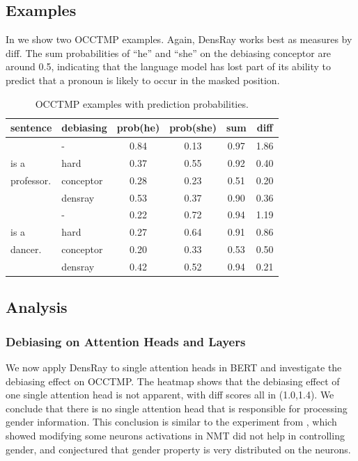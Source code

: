 \subsection{Examples}
In  we show two OCCTMP examples.
Again, DensRay works best as measures by diff.
The sum probabilities of ``he'' and ``she''
on the debiasing conceptor are around 0.5, indicating that
the language model has lost part of its ability to predict that 
a pronoun is  likely to occur in the masked position.
\begin{table}[h]
	\centering
	\footnotesize
		\vspace{0cm}  
	\setlength{\abovecaptionskip}{0.1cm}   
	\setlength{\belowcaptionskip}{0cm}  
	\begin{tabular}{llcccc}
		\toprule
		sentence & debiasing & prob(he) & prob(she) &sum&diff\\
		\midrule
		 & - & 0.84 & 0.13&0.97&1.86\\
		\text{[MASK]} is a& hard& 0.37 & 0.55&0.92&0.40\\
	    professor.	& conceptor& 0.28 & 0.23&0.51&{0.20}\\
		& densray & 0.53 & 0.37&0.90&0.36\\
		\midrule
		 & - & 0.22 & 0.72&0.94&1.19\\
		\text{[MASK]} is a& hard& 0.27 & 0.64&0.91&0.86\\
		dancer.  & conceptor& 0.20 & 0.33&0.53&0.50\\
		& densray& 0.42 & 0.52&0.94&0.21\\
		\bottomrule
	\end{tabular}
	\caption{
		OCCTMP examples with prediction probabilities.}
\end{table}

\subsection{Analysis}

\subsubsection*{Debiasing on Attention Heads and Layers}
We now apply DensRay to single attention heads in BERT and investigate the debiasing effect on OCCTMP. The heatmap  shows that the debiasing effect of one single attention head is not apparent, with diff scores all in (1.0,1.4). We conclude that there is no single attention head that is responsible for processing gender information.
This conclusion is similar to the experiment from , which showed modifying some neurons activations in NMT did not help in controlling gender, and conjectured that gender property is very distributed on the neurons.

